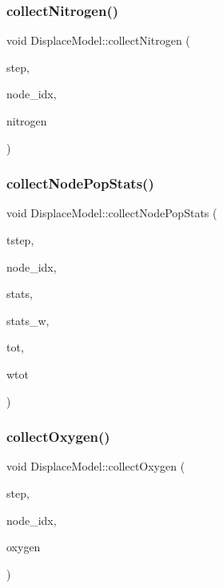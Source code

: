 \subsubsection{\texorpdfstring{collectNitrogen()}{collectNitrogen()}}
{\footnotesize\ttfamily void Displace\+Model\+::collect\+Nitrogen (\begin{DoxyParamCaption}\item[{int}]{step,  }\item[{int}]{node\+\_\+idx,  }\item[{double}]{nitrogen }\end{DoxyParamCaption})}

\mbox{\label{class_displace_model_ac78a0131ef9714989eb2cdc4ebe163a2}} 
\subsubsection{\texorpdfstring{collectNodePopStats()}{collectNodePopStats()}}
{\footnotesize\ttfamily void Displace\+Model\+::collect\+Node\+Pop\+Stats (\begin{DoxyParamCaption}\item[{int}]{tstep,  }\item[{int}]{node\+\_\+idx,  }\item[{const Q\+List$<$ double $>$ \&}]{stats,  }\item[{const Q\+List$<$ double $>$ \&}]{stats\+\_\+w,  }\item[{double}]{tot,  }\item[{double}]{wtot }\end{DoxyParamCaption})}

\mbox{\label{class_displace_model_ab52bd849f9188e7d1452c3b0238d7327}} 
\subsubsection{\texorpdfstring{collectOxygen()}{collectOxygen()}}
{\footnotesize\ttfamily void Displace\+Model\+::collect\+Oxygen (\begin{DoxyParamCaption}\item[{int}]{step,  }\item[{int}]{node\+\_\+idx,  }\item[{double}]{oxygen }\end{DoxyParamCaption})}


